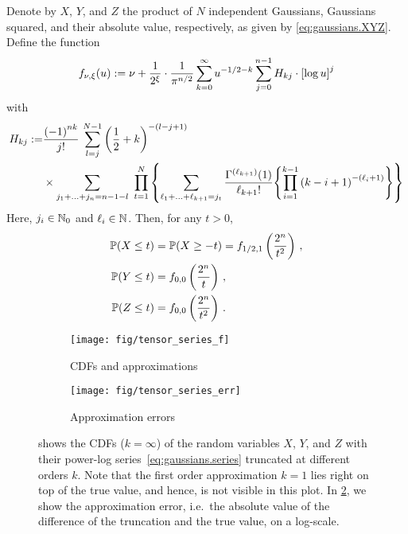 \begin{theorem}%
  \label{thm:CDF_as_mejier_g}
  Denote by $X$, $Y$, and $Z$ the product of $N$ independent Gaussians, Gaussians squared, and their absolute value, respectively, as given by \cref{eq:gaussians.XYZ}.
  Define the function
  \[
    \label{eq:gaussians.series}
    f_{\nu, \xi}(u)
    :=
    \nu + \frac{1}{2^{\xi}} \cdot \frac{1}{\pi^{n/2}} \sum_{k=0}^{\infty} u^{-1/2-k} \sum_{j=0}^{n-1} H_{kj} \cdot {\left[\log u\right]}^j
  \]
  with
  \[
    \begin{split}
      H_{kj}
      :=&
      \frac{{(-1)}^{nk}}{j!} \, \sum_{l=j}^{N-1} {\left(\frac{1}{2}+k\right)}^{-(l-j+1)} \\
      & \times \sum_{j_1+\ldots+j_n=n-1-l} \ \prod_{t=1}^N {\left\{\sum_{\ell_1+\ldots+\ell_{k+1}=j_t} \frac{\Gamma^{(\ell_{k+1})}(1)}{\ell_{k+1}!} {\left\{\prod_{i=1}^{k-1} {\left(k-i+1\right)}^{-(\ell_i+1)}\right\}}\right\}}
    \end{split}
  \]
  Here, $j_i \in {\mathbb{N}}_0$ and $\ell_i\in {\mathbb{N}}$.
  Then, for any $t> 0$,
  \begin{align}
    \mathbb{P}{\left(X \leq t\right)}&= \mathbb{P}{\left(X \geq -t\right)} = f_{1/2,1}\left(\frac{2^n}{t^2}\right) \, , \label{eq:X_expansion}
    \\
    \mathbb{P}{\left(Y \leq t\right)} &= f_{0,0}\left(\frac{2^n}{t}\right)  \, ,\label{eq:Y_expansion}
    \\
    \mathbb{P}{\left(Z \leq t\right)} &= f_{0,0}\left(\frac{2^n}{t^2}\right) \, .\label{eq:Z_expansion}
  \end{align}
\end{theorem}


\begin{figure*}
  \begin{subfigure}{\columnwidth}
    \texttt{[image: fig/tensor\_series\_f]}
    \caption{%
      \label{fig:gaussians.cdf.f}%
      CDFs and approximations
    }
  \end{subfigure}
  \begin{subfigure}{\columnwidth}
    \texttt{[image: fig/tensor\_series\_err]}
    \caption{%
      \label{fig:gaussians.cdf.err}%
      Approximation errors
    }
  \end{subfigure}
  \caption{%
    \label{fig:gaussians.cdfs}%
     shows the CDFs ($k=\infty$) of the random variables $X$, $Y$, and $Z$ with their power-log series~\eqref{eq:gaussians.series} truncated at different orders $k$.
    Note that the first order approximation $k=1$ lies right on top of the true value, and hence, is not visible in this plot.
    In \cref{fig:gaussians.cdf.err}, we show the approximation error, i.e.\ the absolute value of the difference of the truncation and the true value, on a log-scale.
  }
\end{figure*}

